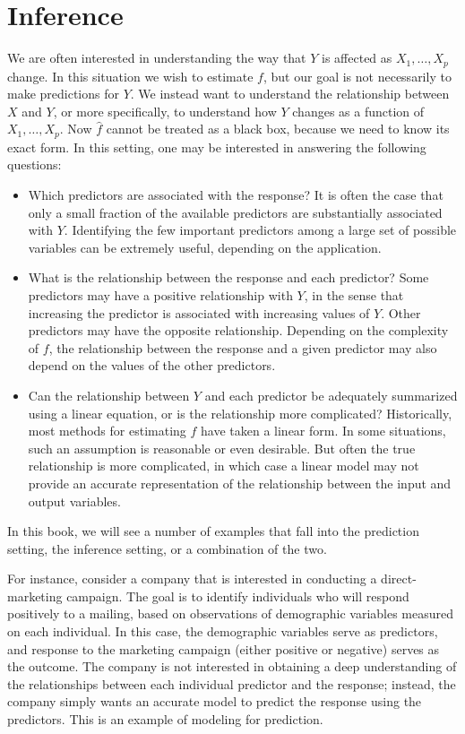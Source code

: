 \documentclass[10pt]{article}
\begin{document}
\section*{Inference}
We are often interested in understanding the way that $Y$ is affected as $X_{1}, \ldots, X_{p}$ change. In this situation we wish to estimate $f$, but our goal is not necessarily to make predictions for $Y$. We instead want to understand the relationship between $X$ and $Y$, or more specifically, to understand how $Y$ changes as a function of $X_{1}, \ldots, X_{p}$. Now $\hat{f}$ cannot be treated as a black box, because we need to know its exact form. In this setting, one may be interested in answering the following questions:

\begin{itemize}
  \item Which predictors are associated with the response? It is often the case that only a small fraction of the available predictors are substantially associated with $Y$. Identifying the few important predictors among a large set of possible variables can be extremely useful, depending on the application.
  \item What is the relationship between the response and each predictor? Some predictors may have a positive relationship with $Y$, in the sense that increasing the predictor is associated with increasing values of $Y$. Other predictors may have the opposite relationship. Depending on the complexity of $f$, the relationship between the response and a given predictor may also depend on the values of the other predictors.
  \item Can the relationship between $Y$ and each predictor be adequately summarized using a linear equation, or is the relationship more complicated? Historically, most methods for estimating $f$ have taken a linear form. In some situations, such an assumption is reasonable or even desirable. But often the true relationship is more complicated, in which case a linear model may not provide an accurate representation of the relationship between the input and output variables.

\end{itemize}

In this book, we will see a number of examples that fall into the prediction setting, the inference setting, or a combination of the two.

For instance, consider a company that is interested in conducting a direct-marketing campaign. The goal is to identify individuals who will respond positively to a mailing, based on observations of demographic variables measured on each individual. In this case, the demographic variables serve as predictors, and response to the marketing campaign (either positive or negative) serves as the outcome. The company is not interested in obtaining a deep understanding of the relationships between each individual predictor and the response; instead, the company simply wants an accurate model to predict the response using the predictors. This is an example of modeling for prediction.
\end{document}
